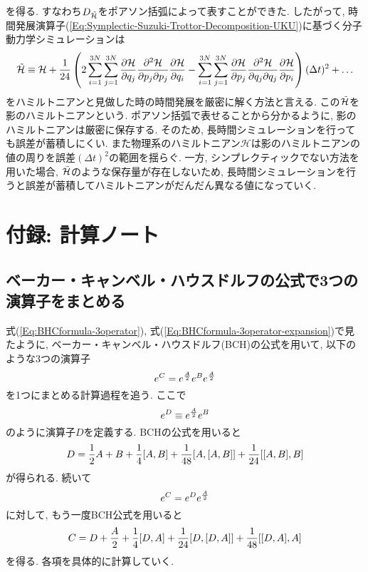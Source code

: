 を得る. すなわち$D_{\Tilde{\mathcal{H}}}$をポアソン括弧によって表すことができた.
したがって, 時間発展演算子(\ref{Eq:Symplectic-Suzuki-Trottor-Decomposition-UKU})に基づく分子動力学シミュレーションは
\begin{align}
  \Tilde{\mathcal{H}}
  \equiv
  \mathcal{H}
  +
  \frac{1}{24}
    \left(
      2
      \sum_{i=1}^{3N} \sum_{j=1}^{3N}
      \frac{\partial \mathcal{H}}{\partial q_{j}}
      \frac{\partial^{2} \mathcal{H}}{\partial p_{j} \partial p_{j}}
      \frac{\partial \mathcal{H}}{\partial q_{i}}
    -
      \sum_{i=1}^{3N} \sum_{j=1}^{3N}
      \frac{\partial \mathcal{H}}{\partial p_{j}}
      \frac{\partial^{2} \mathcal{H}}{\partial q_{j} \partial q_{j}}
      \frac{\partial \mathcal{H}}{\partial p_{i}}
    \right)
    (\Delta t)^{2}
    + \ldots
\end{align}
をハミルトニアンと見做した時の時間発展を厳密に解く方法と言える.
この$\Tilde{\mathcal{H}}$を影のハミルトニアンという.
ポアソン括弧で表せることから分かるように, 影のハミルトニアンは厳密に保存する.
そのため, 長時間シミュレーションを行っても誤差が蓄積しにくい.
また物理系のハミルトニアン$\mathcal{H}$は影のハミルトニアンの値の周りを誤差$(\Delta t)^2$の範囲を揺らぐ.
一方, シンプレクティックでない方法を用いた場合, $\Tilde{\mathcal{H}}$のような保存量が存在しないため, 長時間シミュレーションを行うと誤差が蓄積してハミルトニアンがだんだん異なる値になっていく.

\clearpage

\section{付録: 計算ノート}
\subsection{ベーカー・キャンベル・ハウスドルフの公式で3つの演算子をまとめる}
式(\ref{Eq:BHCformula-3operator}), 式(\ref{Eq:BHCformula-3operator-expansion})で見たように, ベーカー・キャンベル・ハウスドルフ(BCH)の公式を用いて, 以下のような3つの演算子
\begin{equation}
  e^{C} = e^{\frac{A}{2}} e^{B} e^{\frac{A}{2}}
  \notag
\end{equation}
を1つにまとめる計算過程を追う.
ここで
\begin{equation}
  e^{D} \equiv e^{\frac{A}{2}} e^{B}
  \notag
\end{equation}
のように演算子$D$を定義する.
BCHの公式を用いると
\begin{equation}
  D = \frac{1}{2}A + B
    + \frac{1}{4}[A, B]
    + \frac{1}{48}[A, [A,B]]
    + \frac{1}{24}[[A, B], B]
  \notag
\end{equation}
が得られる. 続いて
\begin{equation}
  e^{C} = e^{D} e^{\frac{A}{2}}
  \notag
\end{equation}
に対して, もう一度BCH公式を用いると
\begin{equation}
  C = D + \frac{A}{2}
    + \frac{1}{4}[D, A]
    + \frac{1}{24}[D, [D, A]]
    + \frac{1}{48}[[D, A], A]
  \notag
\end{equation}
を得る. 各項を具体的に計算していく.

